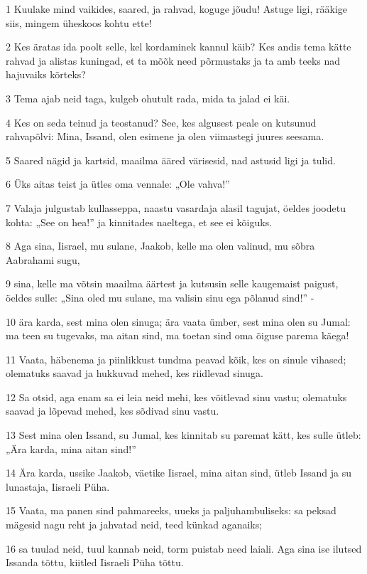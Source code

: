 \par 1 Kuulake mind vaikides, saared, ja rahvad, koguge jõudu! Astuge ligi, rääkige siis, mingem üheskoos kohtu ette!
\par 2 Kes äratas ida poolt selle, kel kordaminek kannul käib? Kes andis tema kätte rahvad ja alistas kuningad, et ta mõõk need põrmustaks ja ta amb teeks nad hajuvaiks kõrteks?
\par 3 Tema ajab neid taga, kulgeb ohutult rada, mida ta jalad ei käi.
\par 4 Kes on seda teinud ja teostanud? See, kes algusest peale on kutsunud rahvapõlvi: Mina, Issand, olen esimene ja olen viimastegi juures seesama.
\par 5 Saared nägid ja kartsid, maailma ääred värisesid, nad astusid ligi ja tulid.
\par 6 Üks aitas teist ja ütles oma vennale: „Ole vahva!”
\par 7 Valaja julgustab kullasseppa, naastu vasardaja alasil tagujat, öeldes joodetu kohta: „See on hea!” ja kinnitades naeltega, et see ei kõiguks.
\par 8 Aga sina, Iisrael, mu sulane, Jaakob, kelle ma olen valinud, mu sõbra Aabrahami sugu,
\par 9 sina, kelle ma võtsin maailma äärtest ja kutsusin selle kaugemaist paigust, öeldes sulle: „Sina oled mu sulane, ma valisin sinu ega põlanud sind!” -
\par 10 ära karda, sest mina olen sinuga; ära vaata ümber, sest mina olen su Jumal: ma teen su tugevaks, ma aitan sind, ma toetan sind oma õiguse parema käega!
\par 11 Vaata, häbenema ja piinlikkust tundma peavad kõik, kes on sinule vihased; olematuks saavad ja hukkuvad mehed, kes riidlevad sinuga.
\par 12 Sa otsid, aga enam sa ei leia neid mehi, kes võitlevad sinu vastu; olematuks saavad ja lõpevad mehed, kes sõdivad sinu vastu.
\par 13 Sest mina olen Issand, su Jumal, kes kinnitab su paremat kätt, kes sulle ütleb: „Ära karda, mina aitan sind!”
\par 14 Ära karda, ussike Jaakob, väetike Iisrael, mina aitan sind, ütleb Issand ja su lunastaja, Iisraeli Püha.
\par 15 Vaata, ma panen sind pahmareeks, uueks ja paljuhambuliseks: sa peksad mägesid nagu reht ja jahvatad neid, teed künkad aganaiks;
\par 16 sa tuulad neid, tuul kannab neid, torm puistab need laiali. Aga sina ise ilutsed Issanda tõttu, kiitled Iisraeli Püha tõttu.
